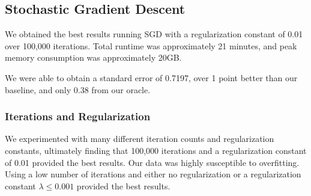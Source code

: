 \documentclass[journal]{IEEEtran}
\begin{document}
\subsection{Stochastic Gradient Descent}

We obtained the best results running SGD with a regularization constant of 0.01 over 100,000 iterations.  Total runtime was approximately 21 minutes, and peak memory consumption was approximately 20GB.
\\
\par We were able to obtain a standard error of 0.7197, over 1 point better than our baseline,
and only 0.38 from our oracle.
\\
\subsubsection{Iterations and Regularization}
We experimented with many different iteration counts and regularization constants, ultimately finding that 100,000 iterations and a regularization constant of 0.01 provided the best results.  Our data was highly susceptible to overfitting.  Using a low number of iterations and either no regularization or a regularization constant $ \lambda \leq 0.001 $  provided the best results.

\end{document}

